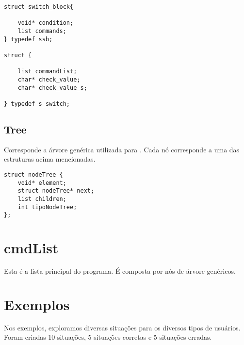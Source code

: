 \documentclass[a4paper,10pt]{article}
\begin{document}
\begin{lstlisting}
struct switch_block{

    void* condition;
    list commands;
} typedef ssb;

struct {

	list commandList;
	char* check_value;
    char* check_value_s;

} typedef s_switch;
\end{lstlisting}

\subsection{Tree}
Corresponde a árvore genérica utilizada para . Cada nó corresponde a uma das estruturas acima mencionadas.
\begin{lstlisting}
struct nodeTree {
	void* element;
	struct nodeTree* next;
	list children;
	int tipoNodeTree;
};
\end{lstlisting}

\section{cmdList}

Esta é a lista principal do programa. É composta por nós de árvore genéricos.

\section{Exemplos}
Nos exemplos, exploramos diversas situações para os diversos tipos de usuários. Foram criadas 10 situações, 5 situações corretas e 5 
situações erradas.
\end{document}
